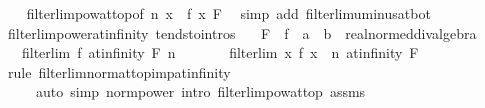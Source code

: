 \begin{isabellebody}
%
\isadelimproof
\ \ %
\endisadelimproof
%
\isatagproof
{}\isamarkupfalse%
\ filterlim{\isacharunderscore}{\kern0pt}pow{\isacharunderscore}{\kern0pt}at{\isacharunderscore}{\kern0pt}top{\isacharbrackleft}{\kern0pt}of\ n\ {\isachardoublequoteopen}{\isasymlambda}x{\isachardot}{\kern0pt}\ {\isacharminus}{\kern0pt}\ f\ x{\isachardoublequoteclose}\ F{\isacharbrackright}{\kern0pt}\ \isamarkupfalse%
\ {\isacharparenleft}{\kern0pt}simp\ add{\isacharcolon}{\kern0pt}\ filterlim{\isacharunderscore}{\kern0pt}uminus{\isacharunderscore}{\kern0pt}at{\isacharunderscore}{\kern0pt}bot{\isacharparenright}{\kern0pt}%
\endisatagproof
{\isafoldproof}%
%
\isadelimproof
\isanewline
%
\endisadelimproof
\isanewline
{}\isamarkupfalse%
\ filterlim{\isacharunderscore}{\kern0pt}power{\isacharunderscore}{\kern0pt}at{\isacharunderscore}{\kern0pt}infinity\ {\isacharbrackleft}{\kern0pt}tendsto{\isacharunderscore}{\kern0pt}intros{\isacharbrackright}{\kern0pt}{\isacharcolon}{\kern0pt}\isanewline
\ \ \ F\ \ f\ {\isacharcolon}{\kern0pt}{\isacharcolon}{\kern0pt}\ {\isachardoublequoteopen}{\isacharprime}{\kern0pt}a\ {\isasymRightarrow}\ {\isacharprime}{\kern0pt}b\ {\isacharcolon}{\kern0pt}{\isacharcolon}{\kern0pt}\ real{\isacharunderscore}{\kern0pt}normed{\isacharunderscore}{\kern0pt}div{\isacharunderscore}{\kern0pt}algebra{\isachardoublequoteclose}\isanewline
\ \ \ {\isachardoublequoteopen}filterlim\ f\ at{\isacharunderscore}{\kern0pt}infinity\ F{\isachardoublequoteclose}\ {\isachardoublequoteopen}n\ {\isachargreater}{\kern0pt}\ {}{\isachardoublequoteclose}\isanewline
\ \ \ \ \ {\isachardoublequoteopen}filterlim\ {\isacharparenleft}{\kern0pt}{\isasymlambda}x{\isachardot}{\kern0pt}\ f\ x\ {\isacharcircum}{\kern0pt}\ n{\isacharparenright}{\kern0pt}\ at{\isacharunderscore}{\kern0pt}infinity\ F{\isachardoublequoteclose}\isanewline
%
\isadelimproof
\ \ %
\endisadelimproof
%
\isatagproof
{}\isamarkupfalse%
\ {\isacharparenleft}{\kern0pt}rule\ filterlim{\isacharunderscore}{\kern0pt}norm{\isacharunderscore}{\kern0pt}at{\isacharunderscore}{\kern0pt}top{\isacharunderscore}{\kern0pt}imp{\isacharunderscore}{\kern0pt}at{\isacharunderscore}{\kern0pt}infinity{\isacharparenright}{\kern0pt}\isanewline
\ \ \ \ \ {\isacharparenleft}{\kern0pt}auto\ simp{\isacharcolon}{\kern0pt}\ norm{\isacharunderscore}{\kern0pt}power\ intro{\isacharbang}{\kern0pt}{\isacharcolon}{\kern0pt}\ filterlim{\isacharunderscore}{\kern0pt}pow{\isacharunderscore}{\kern0pt}at{\isacharunderscore}{\kern0pt}top\ assms\isanewline

\end{isabellebody}
